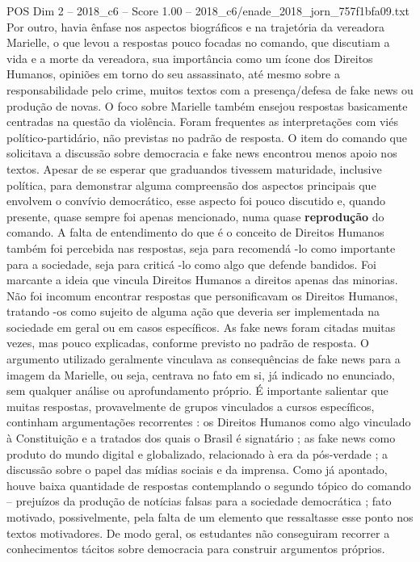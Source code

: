 \begin{textsample}{POS Dim 2 – 2018\_c6 – Score 1.00 – 2018\_c6/enade\_2018\_jorn\_757f1bfa09.txt}
Por outro, havia ênfase nos aspectos biográficos e na trajetória da vereadora Marielle, o que levou a respostas pouco focadas no comando, que discutiam a vida e a morte da vereadora, sua importância como um ícone dos Direitos Humanos, opiniões em torno do seu assassinato, até mesmo sobre a responsabilidade pelo crime, muitos textos com a presença/defesa de fake news ou produção de novas.
O foco sobre Marielle também ensejou respostas basicamente centradas na questão da violência.
Foram frequentes as interpretações com viés político-partidário, não previstas no padrão de resposta.
O item do comando que solicitava a discussão sobre democracia e fake news encontrou menos apoio nos textos.
Apesar de se esperar que graduandos tivessem maturidade, inclusive política, para demonstrar alguma compreensão dos aspectos principais que envolvem o convívio democrático, esse aspecto foi pouco discutido e, quando presente, quase sempre foi apenas mencionado, numa quase \textbf{reprodução} do comando.
A falta de entendimento do que é o conceito de Direitos Humanos também foi percebida nas respostas, seja para recomendá -lo como importante para a sociedade, seja para criticá -lo como algo que defende bandidos.
Foi marcante a ideia que vincula Direitos Humanos a direitos apenas das minorias.
Não foi incomum encontrar respostas que personificavam os Direitos Humanos, tratando -os como sujeito de alguma ação que deveria ser implementada na sociedade em geral ou em casos específicos.
As fake news foram citadas muitas vezes, mas pouco explicadas, conforme previsto no padrão de resposta.
O argumento utilizado geralmente vinculava as consequências de fake news para a imagem da Marielle, ou seja, centrava no fato em si, já indicado no enunciado, sem qualquer análise ou aprofundamento próprio.
É importante salientar que muitas respostas, provavelmente de grupos vinculados a cursos específicos, continham argumentações recorrentes : os Direitos Humanos como algo vinculado à Constituição e a tratados dos quais o Brasil é signatário ; as fake news como produto do mundo digital e globalizado, relacionado à era da pós-verdade ; a discussão sobre o papel das mídias sociais e da imprensa.
Como já apontado, houve baixa quantidade de respostas contemplando o segundo tópico do comando – prejuízos da produção de notícias falsas para a sociedade democrática ; fato motivado, possivelmente, pela falta de um elemento que ressaltasse esse ponto nos textos motivadores.
De modo geral, os estudantes não conseguiram recorrer a conhecimentos tácitos sobre democracia para construir argumentos próprios.

\end{textsample}
